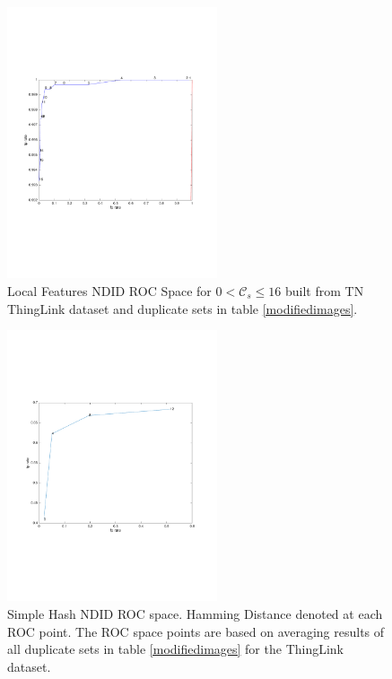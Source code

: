 \documentclass[english,12pt,a4paper,pdftex,elec,utf8, table]{aaltothesis}
\begin{document}
\begin{figure}[htb]
\begin{center}
\includegraphics[height=8cm]{figures/thinglink_SIFTROCperCutoff}
\end{center}
\caption{ Local Features NDID ROC Space for $0 < \mathcal{C}_{s} \leq 16$ built from TN ThingLink dataset and duplicate sets in table \ref{modifiedimages}.}
\label{thinglinkfigcutoffrocspace}
\end{figure}

\begin{figure}[htb]
\begin{center}
\includegraphics[height=8cm]{figures/thinglink_simpleTotalROC}
\end{center}
\caption{Simple Hash NDID ROC space. Hamming Distance denoted at each ROC point. The ROC space points are based on averaging results of all duplicate sets in table \ref{modifiedimages} for the ThingLink dataset. }
\label{thinglinksimpletotalroc}
\end{figure}
\end{document}
